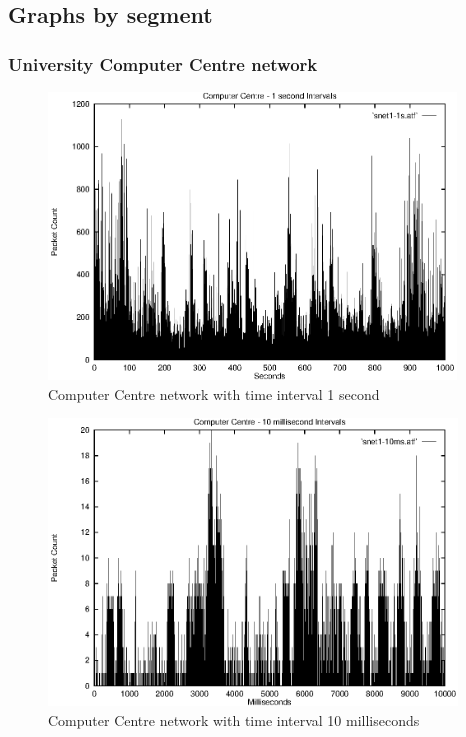 \subsection{Graphs by segment}

\subsubsection{University Computer Centre network}

\begin{figure}
\includegraphics[height=3in]{pics/snet1-1s-freq.eps}
\caption{Computer Centre network with time interval 1 second}
\label{results:snet1.1s.freq}
\end{figure}

\begin{figure}
\includegraphics[height=3in]{pics/snet1-10ms-freq.eps}
\caption{Computer Centre network with time interval 10 milliseconds}
\label{results:snet1.10ms.freq}
\end{figure}

